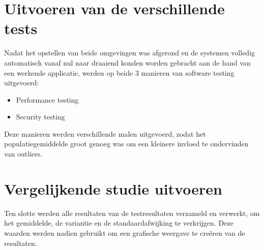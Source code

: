 \section{Uitvoeren van de verschillende tests}
Nadat het opstellen van beide omgevingen was afgerond en de systemen volledig automatisch vanaf nul naar draaiend konden worden gebracht aan de hand van een werkende applicatie, werden op beide 3 manieren van software testing uitgevoerd:
\begin{itemize}[noitemsep]
	\item Performance testing
	\item Security testing
\end{itemize}
Deze manieren werden verschillende malen uitgevoerd, zodat het populatiegemiddelde groot genoeg was om een kleinere invloed te ondervinden van outliers.

\section{Vergelijkende studie uitvoeren}
Ten slotte werden alle resultaten van de testresultaten verzameld en verwerkt, om het gemiddelde, de variantie en de standaardafwijking te verkrijgen. Deze waarden werden nadien gebruikt om een grafische weergave te creëren van de resultaten.